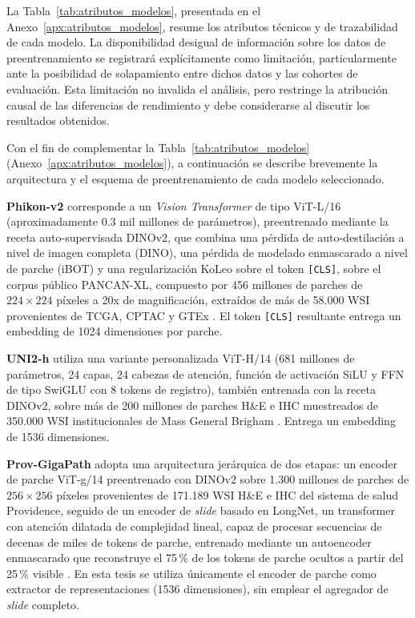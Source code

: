 La Tabla~\ref{tab:atributos_modelos}, presentada en el Anexo~\ref{apx:atributos_modelos}, resume los atributos técnicos y de trazabilidad de cada modelo. La disponibilidad desigual de información sobre los datos de preentrenamiento se registrará explícitamente como limitación, particularmente ante la posibilidad de solapamiento entre dichos datos y las cohortes de evaluación. Esta limitación no invalida el análisis, pero restringe la atribución causal de las diferencias de rendimiento y debe considerarse al discutir los resultados obtenidos.

Con el fin de complementar la Tabla~\ref{tab:atributos_modelos} (Anexo~\ref{apx:atributos_modelos}),
a continuación se describe brevemente la arquitectura y el
esquema de preentrenamiento de cada modelo seleccionado.

\textbf{Phikon-v2} corresponde a un \textit{Vision Transformer} de tipo ViT-L/16
(aproximadamente 0.3 mil millones de parámetros), preentrenado mediante la receta
auto-supervisada DINOv2, que combina una pérdida de auto-destilación a nivel de
imagen completa (DINO), una pérdida de modelado enmascarado a nivel de parche
(iBOT) y una regularización KoLeo sobre el token \texttt{[CLS]}, sobre el corpus
público PANCAN-XL, compuesto por 456 millones de parches de $224\times224$ píxeles
a 20x de magnificación, extraídos de más de 58.000 WSI provenientes de TCGA, CPTAC
y GTEx \citep{filiot2024phikonv2}. El token \texttt{[CLS]} resultante entrega un
embedding de 1024 dimensiones por parche.

\textbf{UNI2-h} utiliza una variante personalizada ViT-H/14 (681 millones de
parámetros, 24 capas, 24 cabezas de atención, función de activación SiLU y
FFN de tipo SwiGLU con 8 tokens de registro), también entrenada con la receta
DINOv2, sobre más de 200 millones de parches H\&E e IHC muestreados de 350.000
WSI institucionales de Mass General Brigham \citep{chen2024uni}. Entrega un
embedding de 1536 dimensiones.

\textbf{Prov-GigaPath} adopta una arquitectura jerárquica de dos etapas: un
encoder de parche ViT-g/14 preentrenado con DINOv2 sobre 1.300 millones de
parches de $256\times256$ píxeles provenientes de 171.189 WSI H\&E e IHC del
sistema de salud Providence, seguido de un encoder de \textit{slide} basado en
LongNet, un transformer con atención dilatada de complejidad lineal, capaz de
procesar secuencias de decenas de miles de tokens de parche, entrenado mediante
un autoencoder enmascarado que reconstruye el 75\,\% de los tokens de parche
ocultos a partir del 25\,\% visible \citep{xu2024provgigapath}. En esta tesis se
utiliza únicamente el encoder de parche como extractor de representaciones
(1536 dimensiones), sin emplear el agregador de \textit{slide} completo.

